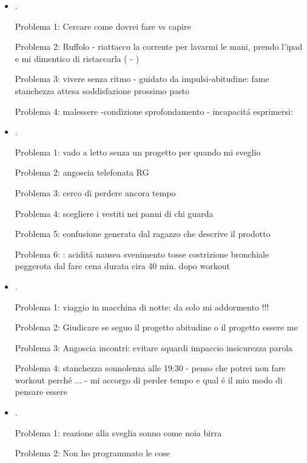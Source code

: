\begin{itemize}
\item {}.

Problema 1: Cercare come dovrei fare vs capire

Problema 2: Ruffolo - riattacco la corrente per lavarmi le mani, prendo l'ipad e mi dimentico di ristaccarla ( - )

Problema 3: vivere senza ritmo - guidato da impulsi-abitudine: fame stanchezza attesa soddisfazione prossimo pasto

Problema 4: malessere -condizione sprofondamento - incapacit\'a esprimersi: 

\item {}.

Problema 1: vado a letto senza un progetto per quando mi sveglio

Problema 2: angoscia telefonata RG

Problema 3: cerco di perdere ancora tempo

Problema 4: scegliere i vestiti nei panni di chi guarda

Problema 5: confusione generata dal ragazzo che descrive il prodotto

Problema 6: : acidit\'a nausea svenimento tosse costrizione bronchiale peggerota dal fare cena durata cira 40 min. dopo workout


\item {}.

Problema 1: viaggio in macchina di notte: da solo mi addormento !!!

Problema 2: Giudicare se seguo il progetto abitudine o il progetto essere me

Problema 3: Angoscia incontri: evitare squardi impaccio insicurezza parola

Problema 4: stanchezza sonnolenza alle 19:30 - penso che potrei non fare workout perch\'e ... - mi accorgo di perder tempo e qual \'e il mio modo di pensare essere

\item {}.

Problema 1: reazione alla sveglia sonno come noia birra

Problema 2: Non ho programmato le cose


\end{itemize}
